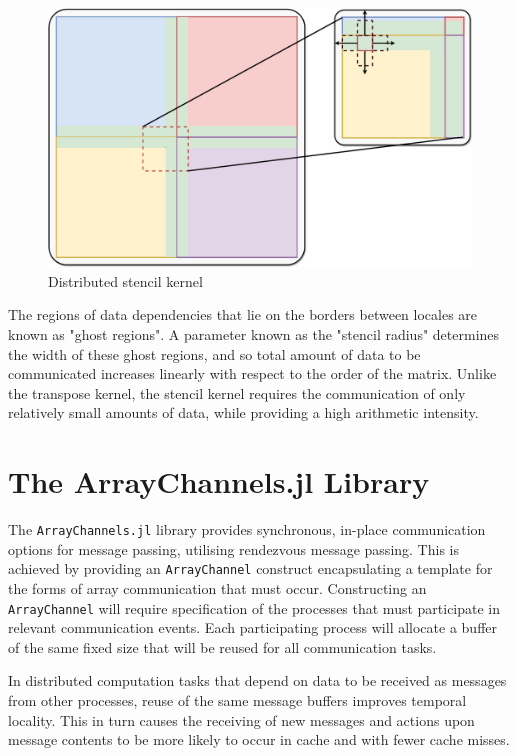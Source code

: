 \documentclass{juliacon}
\begin{document}
\begin{figure}[htb]
	\includegraphics[width=\linewidth]{figs/Stencil.pdf}
	\caption{Distributed stencil kernel}
	\label{fig:stencil-diagram}
\end{figure}

The regions of data dependencies that lie on the borders between locales
are known as "ghost regions". A parameter known as the "stencil radius"
determines the width of these ghost regions, and so total amount of data
to be communicated increases linearly with respect to the order of the
matrix. Unlike the transpose kernel, the stencil kernel requires the
communication of only relatively small amounts of data, while providing
a high arithmetic intensity.

\section{The ArrayChannels.jl Library}
\label{sec:arraychannels}

The \texttt{ArrayChannels.jl} library provides synchronous, in-place
communication options for message passing, utilising rendezvous message
passing. This is achieved by providing an \texttt{ArrayChannel}
construct encapsulating a template for the forms of array communication
that must occur. Constructing an \texttt{ArrayChannel} will require
specification of the processes that must participate in relevant
communication events. Each participating process will allocate a buffer
of the same fixed size that will be reused for all communication tasks.

In distributed computation tasks that depend on data to be received as
messages from other processes, reuse of the same message buffers
improves temporal locality. This in turn causes the receiving of new
messages and actions upon message contents to be more likely to occur in
cache and with fewer cache misses.
\end{document}

